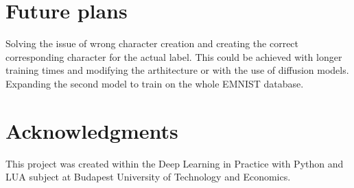 \documentclass[lettersize,journal]{IEEEtran}
\begin{document}
\section{Future plans}
Solving the issue of wrong character creation and creating the correct corresponding character for the actual label. This could be achieved with longer training times and modifying the arthitecture or with the use of diffusion models. Expanding the second model to train on the whole EMNIST database.


\section*{Acknowledgments}
This project was created within the Deep Learning in Practice with Python and LUA subject at Budapest University of Technology and Economics.
\end{document}
